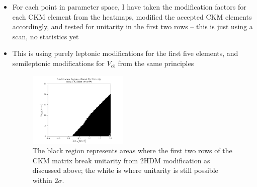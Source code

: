 \documentclass[11pt]{article}
\begin{document}
\begin{itemize}
    \item For each point in parameter space, I have taken the modification factors for each CKM element from the heatmaps, modified the accepted CKM elements accordingly, and tested for unitarity in the first two rows -- this is just using a scan, no statistics yet
    \item This is using purely leptonic modifications for the first five elements, and semileptonic modifications for $V_{cb}$ from the same principles
\begin{figure}[H]
    \centering
    \includegraphics[width=0.45\textwidth]{heatmaps/mod.png}
    \caption{The black region represents areas where the first two rows of the CKM matrix break unitarity from 2HDM modification as discussed above; the white is where unitarity is still possible within $2\sigma$.}
\end{figure}
\end{itemize}
\end{document}
